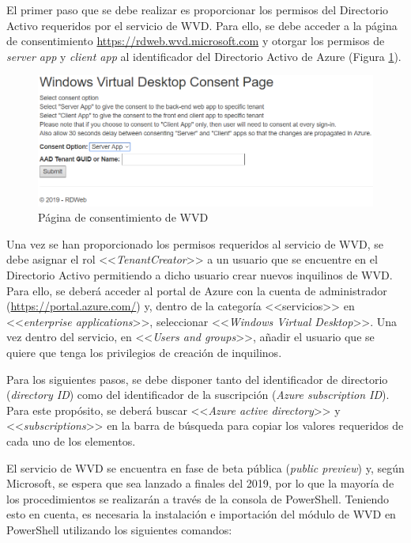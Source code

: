 El primer paso que se debe realizar es proporcionar los permisos del Directorio Activo requeridos por el servicio de \acs{WVD}. Para ello, se debe acceder a la página de consentimiento \url{https://rdweb.wvd.microsoft.com} y otorgar los permisos de \textit{server app} y \textit{client app} al identificador del Directorio Activo de Azure (Figura \ref{fig:consentAAD}).

\begin{figure}[h]
  \centering
  \includegraphics[width=0.8\linewidth]{figures/images/consentAAD.PNG}
  \caption{Página de consentimiento de \acs{WVD}}
  \label{fig:consentAAD}
\end{figure}

\clearpage

Una vez se han proporcionado los permisos requeridos al servicio de \acs{WVD}, se debe asignar el rol <<\textit{TenantCreator}>> a un usuario que se encuentre en el Directorio Activo permitiendo a dicho usuario crear nuevos inquilinos de \acs{WVD}. Para ello, se deberá acceder al portal de Azure con la cuenta de administrador (\url{https://portal.azure.com/}) y, dentro de la categoría <<servicios>> en <<\textit{enterprise applications}>>, seleccionar <<\textit{Windows Virtual Desktop}>>. Una vez dentro del servicio, en <<\textit{Users and groups}>>, añadir el usuario que se quiere que tenga los privilegios de creación de inquilinos.

Para los siguientes pasos, se debe disponer tanto del identificador de directorio (\textit{directory ID}) como del identificador de la suscripción (\textit{Azure subscription ID}). Para este propósito, se deberá buscar <<\textit{Azure active directory}>> y <<\textit{subscriptions}>> en la barra de búsqueda para copiar los valores requeridos de cada uno de los elementos.

El servicio de \acs{WVD} se encuentra en fase de beta pública (\textit{public preview}) y, según Microsoft, se espera que sea lanzado a finales del 2019, por lo que la mayoría de los procedimientos se realizarán a través de la consola de PowerShell. Teniendo esto en cuenta, es necesaria la instalación e importación del módulo de \acs{WVD} en PowerShell utilizando los siguientes comandos:

